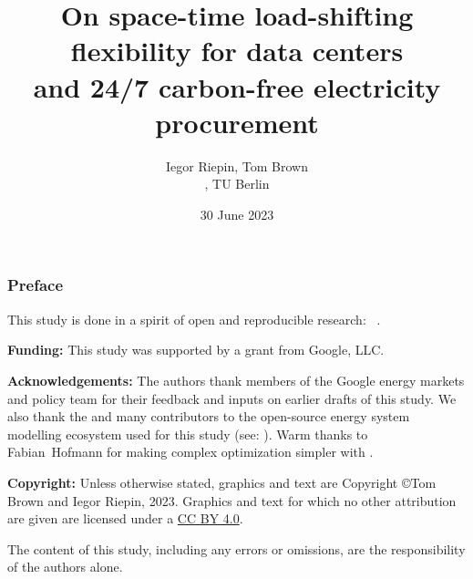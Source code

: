 


\title{On space-time load-shifting flexibility for data centers \\ 
      and 24/7 carbon-free electricity procurement}

\author{
  Iegor Riepin, Tom Brown\\
  , TU Berlin
  }

\date{30 June 2023}




\maketitle

\begin{frame}
  \frametitle{Preface}

  \begin{itemize}
    {\small
    \item This study is done in a spirit of open and reproducible research: \faGithub~.
    \item {\bf Funding:} This study was supported by a grant from Google, LLC. 
    \item {\bf Acknowledgements:} The authors thank members of the Google energy markets and policy team 
    for their feedback and inputs on earlier drafts of this study. 
    We also thank the  and many contributors to the open-source 
    energy system modelling ecosystem used for this study (see: ).
    Warm thanks to Fabian~Hofmann for making complex optimization simpler with . 
    \item 
    {\bf Copyright:} Unless otherwise stated, graphics and text are Copyright \copyright Tom Brown and Iegor Riepin, 2023.
    Graphics and text for which no other attribution are given are licensed under a 
    \href{https://creativecommons.org/licenses/by/4.0/}{CC BY 4.0}.  {\footnotesize \ccby} 
    \item The content of this study, including any errors or omissions, are the responsibility
    of the authors alone.
    }
  \end{itemize}

\end{frame}


